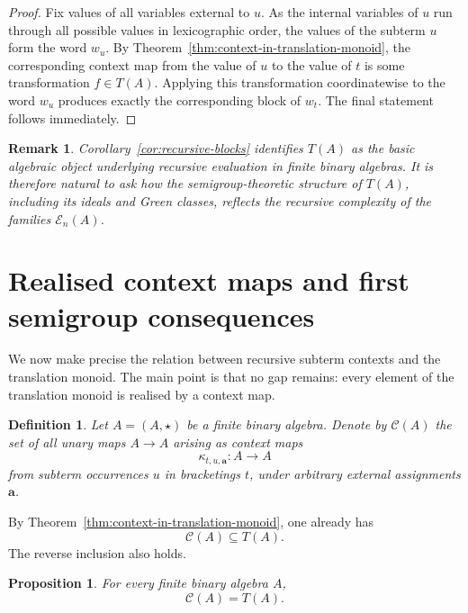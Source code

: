 \documentclass[11pt]{article}
\newtheorem{definition}[theorem]{Definition}
\newtheorem{remark}[theorem]{Remark}
\newtheorem{proposition}[theorem]{Proposition}
\newcommand{\E}{\mathcal E}
\begin{document}
\begin{proof}
Fix values of all variables external to \(u\). As the internal variables of
\(u\) run through all possible values in lexicographic order, the values of the
subterm \(u\) form the word \(w_u\). By
Theorem~\ref{thm:context-in-translation-monoid}, the corresponding context map
from the value of \(u\) to the value of \(t\) is some transformation
\(f\in T(A)\). Applying this transformation coordinatewise to the word \(w_u\)
produces exactly the corresponding block of \(w_t\). The final statement follows
immediately.
\end{proof}





\begin{remark}
Corollary~\ref{cor:recursive-blocks} identifies \(T(A)\) as the basic algebraic
object underlying recursive evaluation in finite binary algebras. It is
therefore natural to ask how the semigroup-theoretic structure of \(T(A)\),
including its ideals and Green classes, reflects the recursive complexity of the
families \(\E_n(A)\).
\end{remark}


\newpage

\section{Realised context maps and first semigroup consequences}

We now make precise the relation between recursive subterm contexts and the
translation monoid. The main point is that no gap remains: every element of the
translation monoid is realised by a context map.

\begin{definition}
Let \(A=(A,\star)\) be a finite binary algebra. Denote by \(\mathcal C(A)\) the
set of all unary maps \(A\to A\) arising as context maps
\[
\kappa_{t,u,\mathbf a}:A\to A
\]
from subterm occurrences \(u\) in bracketings \(t\), under arbitrary external
assignments \(\mathbf a\).
\end{definition}

By Theorem~\ref{thm:context-in-translation-monoid}, one already has
\[
\mathcal C(A)\subseteq T(A).
\]
The reverse inclusion also holds.
\begin{proposition}\label{prop:C-equals-T}
For every finite binary algebra \(A\),
\[
\mathcal C(A)=T(A).
\]
\end{proposition}
\end{document}
